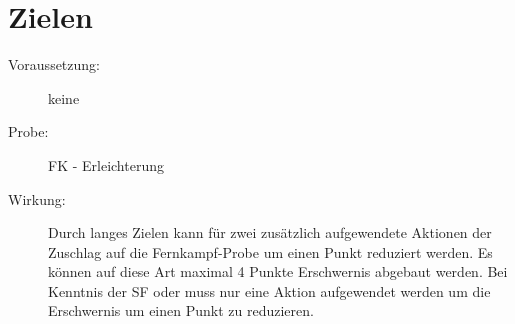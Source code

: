 \section{Zielen}
\label{fernkampf.zielen}
\begin{description}
    \item[Voraussetzung:]
        keine
    \item[Probe:]
        FK - Erleichterung
    \item[Wirkung:]
        Durch langes Zielen kann für zwei zusätzlich aufgewendete Aktionen der Zuschlag auf die Fernkampf-Probe um einen Punkt reduziert werden.
        Es können auf diese Art maximal 4 Punkte Erschwernis abgebaut werden.
        Bei Kenntnis der SF  oder  muss nur eine Aktion aufgewendet werden um die Erschwernis um einen Punkt zu reduzieren.
\end{description}
